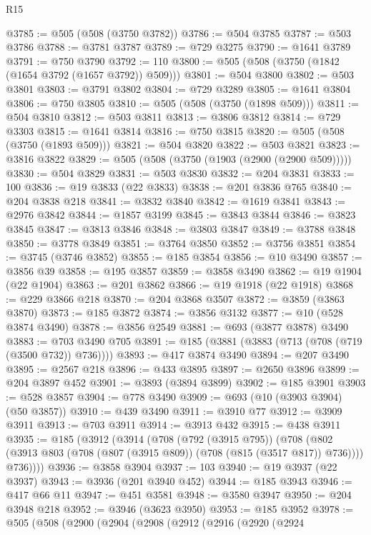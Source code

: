 \begin{lexlean}{R15}
\begin{coremodule}
{{{{{{{{{{{@3785 := @505 (@508 (@3750 @3782))
@3786 := @504 @3785
@3787 := @503 @3786
@3788 := @3781 @3787
@3789 := @729 @3275
@3790 := @1641 @3789
@3791 := @750 @3790
@3792 := 110
@3800 := @505 (@508 (@3750 (@1842 (@1654 @3792 (@1657 @3792)) @509)))
@3801 := @504 @3800
@3802 := @503 @3801
@3803 := @3791 @3802
@3804 := @729 @3289
@3805 := @1641 @3804
@3806 := @750 @3805
@3810 := @505 (@508 (@3750 (@1898 @509)))
@3811 := @504 @3810
@3812 := @503 @3811
@3813 := @3806 @3812
@3814 := @729 @3303
@3815 := @1641 @3814
@3816 := @750 @3815
@3820 := @505 (@508 (@3750 (@1893 @509)))
@3821 := @504 @3820
@3822 := @503 @3821
@3823 := @3816 @3822
@3829 := @505 (@508 (@3750 (@1903 (@2900 (@2900 @509)))))
@3830 := @504 @3829
@3831 := @503 @3830
@3832 := @204 @3831
@3833 := 100
@3836 := @19 @3833 (@22 @3833)
@3838 := @201 @3836 @765
@3840 := @204 @3838 @218
@3841 := @3832 @3840
@3842 := @1619 @3841
@3843 := @2976 @3842
@3844 := @1857 @3199
@3845 := @3843 @3844
@3846 := @3823 @3845
@3847 := @3813 @3846
@3848 := @3803 @3847
@3849 := @3788 @3848
@3850 := @3778 @3849
@3851 := @3764 @3850
@3852 := @3756 @3851
@3854 := @3745 (@3746 @3852)
@3855 := @185 @3854
@3856 := @10 @3490
@3857 := @3856 @39
@3858 := @195 @3857
@3859 := @3858 @3490
@3862 := @19 @1904 (@22 @1904)
@3863 := @201 @3862
@3866 := @19 @1918 (@22 @1918)
@3868 := @229 @3866 @218
@3870 := @204 @3868 @3507
@3872 := @3859 (@3863 @3870)
@3873 := @185 @3872
@3874 := @3856 @3132
@3877 := @10 (@528 @3874 @3490)
@3878 := @3856 @2549
@3881 := @693 (@3877 @3878) @3490
@3883 := @703 @3490 @705
@3891 := @185 (@3881 (@3883 (@713 (@708 (@719 (@3500 @732)) @736))))
@3893 := @417 @3874 @3490
@3894 := @207 @3490
@3895 := @2567 @218
@3896 := @433 @3895
@3897 := @2650 @3896
@3899 := @204 @3897 @452
@3901 := @3893 (@3894 @3899)
@3902 := @185 @3901
@3903 := @528 @3857
@3904 := @778 @3490
@3909 := @693 (@10 (@3903 @3904) (@50 @3857))
@3910 := @439 @3490
@3911 := @3910 @77
@3912 := @3909 @3911
@3913 := @703 @3911
@3914 := @3913 @432
@3915 := @438 @3911
@3935 := @185
    (@3912
      (@3914
        (@708
          (@792 (@3915 @795))
          (@708
            (@802 (@3913 @803 (@708 (@807 (@3915 @809)) (@708 (@815 (@3517 @817)) @736))))
            @736))))
@3936 := @3858 @3904
@3937 := 103
@3940 := @19 @3937 (@22 @3937)
@3943 := @3936 (@201 @3940 @452)
@3944 := @185 @3943
@3946 := @417 @66 @11
@3947 := @451 @3581
@3948 := @3580 @3947
@3950 := @204 @3948 @218
@3952 := @3946 (@3623 @3950)
@3953 := @185 @3952
@3978 := @505
    (@508
      (@2900
        (@2904
          (@2908
            (@2912
              (@2916
                (@2920
                  (@2924
}}}}}}}}}}}
\end{coremodule}
\end{lexlean}

